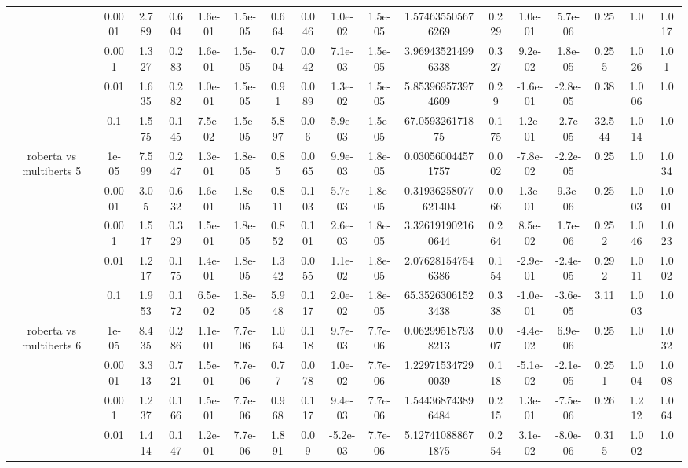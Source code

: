 \begin{tabular}{|c|c|c|c|c|c|c|c|c|c|c|c|c|c|c|c|c|}
 & 0.0001 & 2.789 & 0.604 & 1.6e-01 & 1.5e-05 & 0.664 & 0.046 & 1.0e-02 & 1.5e-05 & 1.574635505676269 & 0.229 & 1.0e-01 & 5.7e-06 & 0.25 & 1.0 & 1.017 \\
 & 0.001 & 1.327 & 0.283 & 1.6e-01 & 1.5e-05 & 0.704 & 0.042 & 7.1e-03 & 1.5e-05 & 3.969435214996338 & 0.327 & 9.2e-02 & 1.8e-05 & 0.255 & 1.026 & 1.01 \\
 & 0.01 & 1.635 & 0.282 & 1.0e-01 & 1.5e-05 & 0.91 & 0.089 & 1.3e-02 & 1.5e-05 & 5.853969573974609 & 0.29 & -1.6e-01 & -2.8e-05 & 0.38 & 1.006 & 1.0 \\
 & 0.1 & 1.575 & 0.145 & 7.5e-02 & 1.5e-05 & 5.897 & 0.06 & 5.9e-03 & 1.5e-05 & 67.059326171875 & 0.175 & 1.2e-01 & -2.7e-05 & 32.544 & 1.014 & 1.0 \\
\hline
\multirow{5}{*}{roberta  vs multiberts 5} & 1e-05 & 7.599 & 0.247 & 1.3e-01 & 1.8e-05 & 0.85 & 0.065 & 9.9e-03 & 1.8e-05 & 0.030560044571757 & 0.002 & -7.8e-02 & -2.2e-05 & 0.25 & 1.0 & 1.034 \\
 & 0.0001 & 3.05 & 0.632 & 1.6e-01 & 1.8e-05 & 0.811 & 0.103 & 5.7e-03 & 1.8e-05 & 0.31936258077621404 & 0.066 & 1.3e-01 & 9.3e-06 & 0.25 & 1.003 & 1.001 \\
 & 0.001 & 1.517 & 0.329 & 1.5e-01 & 1.8e-05 & 0.852 & 0.101 & 2.6e-03 & 1.8e-05 & 3.326191902160644 & 0.264 & 8.5e-02 & 1.7e-06 & 0.252 & 1.046 & 1.023 \\
 & 0.01 & 1.217 & 0.175 & 1.4e-01 & 1.8e-05 & 1.342 & 0.055 & 1.1e-02 & 1.8e-05 & 2.076281547546386 & 0.154 & -2.9e-01 & -2.4e-05 & 0.292 & 1.011 & 1.002 \\
 & 0.1 & 1.953 & 0.172 & 6.5e-02 & 1.8e-05 & 5.948 & 0.117 & 2.0e-02 & 1.8e-05 & 65.35263061523438 & 0.338 & -1.0e-01 & -3.6e-05 & 3.11 & 1.003 & 1.0 \\
\hline
\multirow{5}{*}{roberta  vs multiberts 6} & 1e-05 & 8.435 & 0.286 & 1.1e-01 & 7.7e-06 & 1.064 & 0.118 & 9.7e-03 & 7.7e-06 & 0.062995187938213 & 0.007 & -4.4e-02 & 6.9e-06 & 0.25 & 1.0 & 1.032 \\
 & 0.0001 & 3.313 & 0.721 & 1.5e-01 & 7.7e-06 & 0.77 & 0.078 & 1.0e-02 & 7.7e-06 & 1.229715347290039 & 0.118 & -5.1e-02 & -2.1e-05 & 0.251 & 1.004 & 1.008 \\
 & 0.001 & 1.237 & 0.166 & 1.5e-01 & 7.7e-06 & 0.968 & 0.117 & 9.4e-03 & 7.7e-06 & 1.544368743896484 & 0.215 & 1.3e-01 & -7.5e-06 & 0.26 & 1.212 & 1.064 \\
 & 0.01 & 1.414 & 0.147 & 1.2e-01 & 7.7e-06 & 1.891 & 0.09 & -5.2e-03 & 7.7e-06 & 5.127410888671875 & 0.254 & 3.1e-02 & -8.0e-06 & 0.315 & 1.002 & 1.0 \\

\end{tabular}
